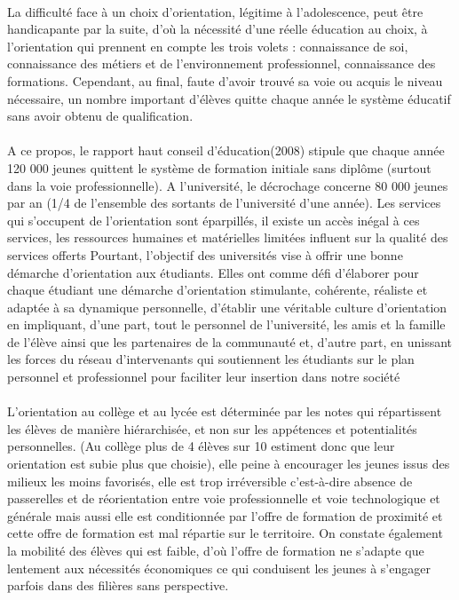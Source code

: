 \paragraph{}
La difficulté face à un choix d’orientation,  légitime à l’adolescence, peut être  handicapante par la suite, d’où la nécessité  d’une réelle  éducation au choix, à l’orientation qui prennent en compte les trois  volets : connaissance de soi, connaissance  des métiers et de l’environnement  professionnel, connaissance des formations. Cependant, au final, faute d’avoir trouvé sa voie ou acquis le niveau nécessaire, un nombre important d’élèves quitte chaque année le système éducatif sans avoir obtenu de qualification. 
\paragraph{}
A ce propos, le rapport  haut conseil d’éducation(2008) stipule que chaque année 120 000 jeunes quittent le  système de formation initiale sans  diplôme (surtout dans la voie  professionnelle). A l’université, le  décrochage concerne 80 000 jeunes par  an (1/4 de l’ensemble des sortants de  l’université d’une année). Les services qui s’occupent de  l’orientation sont éparpillés, il existe un accès inégal à ces services,  les ressources humaines et matérielles limitées influent sur la qualité des services offerts Pourtant, l’objectif des universités vise à offrir une bonne démarche d’orientation aux  étudiants. Elles ont comme défi d’élaborer  pour chaque étudiant une démarche d’orientation stimulante, cohérente, réaliste et adaptée à sa dynamique personnelle, d’établir une véritable culture d’orientation en impliquant, d’une part, tout le personnel de l’université, les amis et la famille de l’élève ainsi que les partenaires de la communauté et, d’autre part, en unissant les forces du réseau d’intervenants qui soutiennent les étudiants sur le plan personnel et professionnel pour faciliter leur insertion dans notre société
\paragraph{}
L’orientation au collège et au lycée est  déterminée par les notes qui répartissent  les élèves de manière hiérarchisée, et non  sur les appétences et potentialités  personnelles. (Au collège plus de 4 élèves  sur 10 estiment donc que leur orientation  est subie plus que choisie), elle peine à encourager les  jeunes issus des milieux les moins  favorisés, elle est trop irréversible c'est-à-dire absence de passerelles et de réorientation  entre voie professionnelle et voie  technologique et générale mais aussi elle est conditionnée par l’offre  de formation de proximité et cette offre  de formation est mal répartie sur le  territoire. On constate également la mobilité des élèves qui est faible, d’où  l’offre de formation ne s’adapte que  lentement aux nécessités économiques ce qui conduisent  les jeunes à s’engager  parfois dans des filières sans perspective. 
